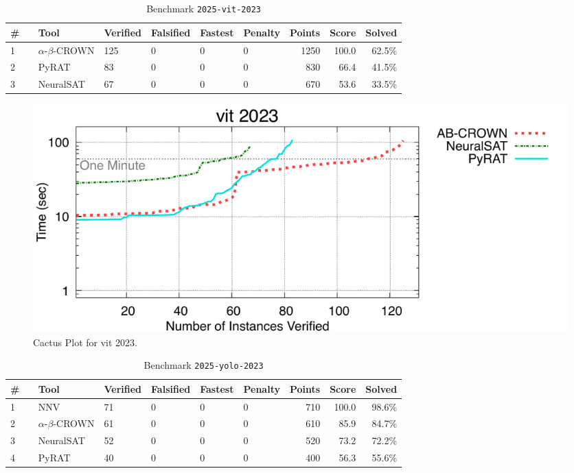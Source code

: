 \clearpage

\begin{table}[h]
\begin{center}
\caption{Benchmark \texttt{2025-vit-2023}} \label{tab:cat_2025_vit_2023}
{\setlength{\tabcolsep}{2pt}
\begin{tabular}[h]{@{}llllllrrr@{}}
\toprule
\textbf{\# ~} & \textbf{Tool} & \textbf{Verified} & \textbf{Falsified} & \textbf{Fastest} & \textbf{Penalty} & \textbf{Points} & \textbf{Score} & \textbf{Solved}\\
\midrule
1 & $\alpha$-$\beta$-CROWN & 125 & 0 & 0 & 0 & 1250 & 100.0 & 62.5\% \\
2 & PyRAT & 83 & 0 & 0 & 0 & 830 & 66.4 & 41.5\% \\
3 & NeuralSAT & 67 & 0 & 0 & 0 & 670 & 53.6 & 33.5\% \\
\bottomrule
\end{tabular}
}
\end{center}
\end{table}



\begin{figure}[h]
\centerline{\includegraphics[width=\textwidth]{cactus/2025_vit_2023.pdf}}
\caption{Cactus Plot for vit 2023.}
\label{fig:quantPic}
\end{figure}


\clearpage

\begin{table}[h]
\begin{center}
\caption{Benchmark \texttt{2025-yolo-2023}} \label{tab:cat_2025_yolo_2023}
{\setlength{\tabcolsep}{2pt}
\begin{tabular}[h]{@{}llllllrrr@{}}
\toprule
\textbf{\# ~} & \textbf{Tool} & \textbf{Verified} & \textbf{Falsified} & \textbf{Fastest} & \textbf{Penalty} & \textbf{Points} & \textbf{Score} & \textbf{Solved}\\
\midrule
1 & NNV & 71 & 0 & 0 & 0 & 710 & 100.0 & 98.6\% \\
2 & $\alpha$-$\beta$-CROWN & 61 & 0 & 0 & 0 & 610 & 85.9 & 84.7\% \\
3 & NeuralSAT & 52 & 0 & 0 & 0 & 520 & 73.2 & 72.2\% \\
4 & PyRAT & 40 & 0 & 0 & 0 & 400 & 56.3 & 55.6\% \\
\bottomrule
\end{tabular}
}
\end{center}
\end{table}




